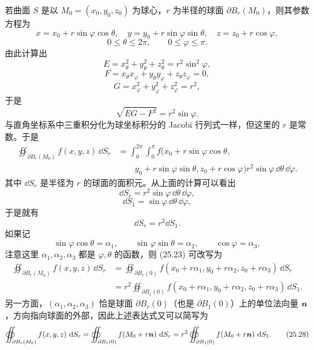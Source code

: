 若曲面 $S$ 是以 $M_0=(x_0,y_0,z_0)$ 为球心，$r$ 为半径的球面 $\partial B_r(M_0)$，则其参数方程为
\[
  x=x_0+r\sin\varphi\cos\theta,\quad
  y=y_0+r\sin\varphi\sin\theta,\quad
  z=z_0+r\cos\varphi,
\]
\[
  0\le\theta\le2\pi,\qquad0\le\varphi\le\pi.
\]
由此计算出
\[
  E=x_\theta^2+y_\theta^2+z_\theta^2=r^2\sin^2\varphi,
\]
\[
  F=x_\theta x_\varphi+y_\theta y_\varphi+z_\theta z_\varphi=0,
\]
\[
  G=x_\varphi^2+y_\varphi^2+z_\varphi^2=r^2,
\]
于是
\[
  \sqrt{EG-F^2}=r^2\sin\varphi.
\]
与直角坐标系中三重积分化为球坐标积分的 Jacobi 行列式一样，但这里的 $r$ 是常数。于是
\begin{equation}
\begin{aligned}
  \oiint_{\partial B_r(M_0)}f(x,y,z)\,\dd S_r
  &=\int_0^{2\pi}\int_0^\pi
  f(x_0+r\sin\varphi\cos\theta,\\
  &\qquad y_0+r\sin\varphi\sin\theta,
  z_0+r\cos\varphi)
  r^2\sin\varphi\,\dd\theta\,\dd\varphi.
\end{aligned}
  \tag{25.23}
\end{equation}
其中 $\dd S_r$ 是半径为 $r$ 的球面的面积元。从上面的计算可以看出
\begin{equation}
  \dd S_r=r^2\sin\varphi\,\dd\theta\,\dd\varphi,
  \tag{25.24}
\end{equation}
\begin{equation}
  \dd S_1=\sin\varphi\,\dd\theta\,\dd\varphi,
  \tag{25.25}
\end{equation}
于是就有
\begin{equation}
  \dd S_r=r^2\dd S_1.
  \tag{25.26}
\end{equation}
如果记
\[
  \sin\varphi\cos\theta=\alpha_1,\qquad
  \sin\varphi\sin\theta=\alpha_2,\qquad
  \cos\varphi=\alpha_3,
\]
注意这里 $\alpha_1,\alpha_2,\alpha_3$ 都是 $\varphi,\theta$ 的函数，则 (25.23) 可改写为
\begin{equation}
\begin{aligned}
  \oiint_{\partial B_r(M_0)}f(x,y,z)\,\dd S_r
  &=\oiint_{\partial B_r(0)}
  f(x_0+r\alpha_1,y_0+r\alpha_2,z_0+r\alpha_3)\,\dd S_r\\
  &=r^2\oiint_{\partial B_1(0)}
  f(x_0+r\alpha_1,y_0+r\alpha_2,z_0+r\alpha_3)\,\dd S_1.
\end{aligned}
  \tag{25.27}
\end{equation}
另一方面，$(\alpha_1,\alpha_2,\alpha_3)$ 恰是球面 $\partial B_r(0)$（也是 $\partial B_1(0)$）上的单位法向量 $\bm{n}$，方向指向球面的外部，因此上述表达式又可以简写为
\begin{equation}
  \oiint_{\partial B_r(M_0)}f(x,y,z)\,\mathop{}\!\mathrm{d} S_r
  =\oiint_{\partial B_r(0)}f(M_0+r\bm{n})\,\mathop{}\!\mathrm{d} S_r
  =r^2\oiint_{\partial B_1(0)}f(M_0+r\bm{n})\,\mathop{}\!\mathrm{d} S_1.
  \tag{25.28}
\end{equation}

